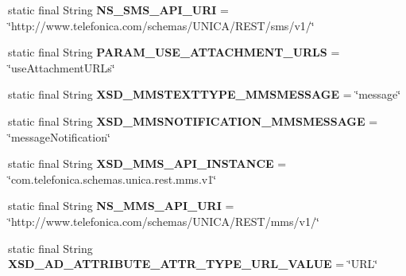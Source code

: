 \begin{DoxyCompactItemize}
\item 
\hypertarget{classcom_1_1bluevia_1_1commons_1_1parser_1_1xml_1_1XmlConstants_adaab8f5996f5cac14d803f2ad01444b8}{
static final String {\bfseries NS\_\-SMS\_\-API\_\-URI} = \char`\"{}http://www.telefonica.com/schemas/UNICA/REST/sms/v1/\char`\"{}}
\label{classcom_1_1bluevia_1_1commons_1_1parser_1_1xml_1_1XmlConstants_adaab8f5996f5cac14d803f2ad01444b8}

\item 
\hypertarget{classcom_1_1bluevia_1_1commons_1_1parser_1_1xml_1_1XmlConstants_a5093a417df1ff570762e9b757e97d128}{
static final String {\bfseries PARAM\_\-USE\_\-ATTACHMENT\_\-URLS} = \char`\"{}useAttachmentURLs\char`\"{}}
\label{classcom_1_1bluevia_1_1commons_1_1parser_1_1xml_1_1XmlConstants_a5093a417df1ff570762e9b757e97d128}

\item 
\hypertarget{classcom_1_1bluevia_1_1commons_1_1parser_1_1xml_1_1XmlConstants_ac0fc0b90aea472f76c1cfda338289974}{
static final String {\bfseries XSD\_\-MMSTEXTTYPE\_\-MMSMESSAGE} = \char`\"{}message\char`\"{}}
\label{classcom_1_1bluevia_1_1commons_1_1parser_1_1xml_1_1XmlConstants_ac0fc0b90aea472f76c1cfda338289974}

\item 
\hypertarget{classcom_1_1bluevia_1_1commons_1_1parser_1_1xml_1_1XmlConstants_ab848facb0311d20162c5e51d9ca19a2d}{
static final String {\bfseries XSD\_\-MMSNOTIFICATION\_\-MMSMESSAGE} = \char`\"{}messageNotification\char`\"{}}
\label{classcom_1_1bluevia_1_1commons_1_1parser_1_1xml_1_1XmlConstants_ab848facb0311d20162c5e51d9ca19a2d}

\item 
\hypertarget{classcom_1_1bluevia_1_1commons_1_1parser_1_1xml_1_1XmlConstants_a0cf94f2c3a5b79d4948773ca133ba000}{
static final String {\bfseries XSD\_\-MMS\_\-API\_\-INSTANCE} = \char`\"{}com.telefonica.schemas.unica.rest.mms.v1\char`\"{}}
\label{classcom_1_1bluevia_1_1commons_1_1parser_1_1xml_1_1XmlConstants_a0cf94f2c3a5b79d4948773ca133ba000}

\item 
\hypertarget{classcom_1_1bluevia_1_1commons_1_1parser_1_1xml_1_1XmlConstants_aab0af6c1d1860551c02b3c3f12ab7dfc}{
static final String {\bfseries NS\_\-MMS\_\-API\_\-URI} = \char`\"{}http://www.telefonica.com/schemas/UNICA/REST/mms/v1/\char`\"{}}
\label{classcom_1_1bluevia_1_1commons_1_1parser_1_1xml_1_1XmlConstants_aab0af6c1d1860551c02b3c3f12ab7dfc}

\item 
\hypertarget{classcom_1_1bluevia_1_1commons_1_1parser_1_1xml_1_1XmlConstants_a77e75abe76caf11f682c71e39c5043a5}{
static final String {\bfseries XSD\_\-AD\_\-ATTRIBUTE\_\-ATTR\_\-TYPE\_\-URL\_\-VALUE} = \char`\"{}URL\char`\"{}}
\label{classcom_1_1bluevia_1_1commons_1_1parser_1_1xml_1_1XmlConstants_a77e75abe76caf11f682c71e39c5043a5}


\end{DoxyCompactItemize}
